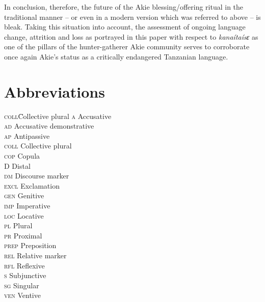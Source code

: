 \documentclass[output=paper,colorlinks,citecolor=brown]{langscibook}
\begin{document}
In conclusion, therefore, the future of the Akie blessing/offering ritual in the traditional manner – or even in a modern version which was referred to above -- is bleak. Taking this situation into account, the assessment of ongoing language change, attrition and loss as portrayed in this paper with respect to \textit{kanaítaísɛ} as one of the pillars of the hunter-gatherer Akie community serves to corroborate once again Akie’s status as a critically endangered Tanzanian language.


\section*{Abbreviations}

\begin{multicols}{2}
\begin{tabbing}
\textsc{coll}\hspace{1ex}\= Collective plural\kill
\textsc{a} \> Accusative\\
\textsc{ad} \> Accusative demonstrative\\
\textsc{ap} \>  Antipassive\\
\textsc{coll} \> Collective plural\\
\textsc{cop} \> Copula\\
\textsc{D} \> Distal\\
\textsc{dm} \> Discourse marker\\ 
\textsc{excl} \> Exclamation\\ 
\textsc{gen} \> Genitive\\ 
\textsc{imp} \> Imperative\\ 
\textsc{loc} \> Locative\\
\textsc{pl} \> Plural\\
\textsc{pr} \> Proximal\\
\textsc{prep}  \> Preposition\\
\textsc{rel} \> Relative marker\\ 
\textsc{rfl} \> Reflexive\\ 
\textsc{s} \> Subjunctive\\
\textsc{sg} \> Singular\\
\textsc{ven} \> Ventive
\end{tabbing}
\end{multicols}



\end{document}
